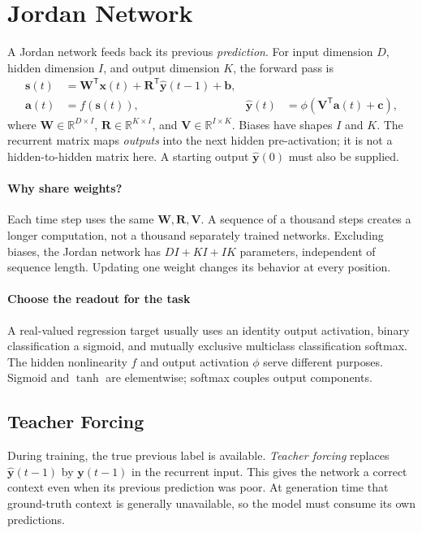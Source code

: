\documentclass[11pt, oneside]{book}
\newcommand{\R}{\mathbb{R}}
\newcommand{\T}{^{\mathsf{T}}}           %
\let\originalsection\section
\renewcommand{\section}{\Needspace{7\baselineskip}\originalsection}
\let\originalsubsection\subsection
\renewcommand{\subsection}{\Needspace{6\baselineskip}\originalsubsection}
\begin{document}
\section{Jordan Network}\label{sec:source-1-1}
A Jordan network feeds back its previous \emph{prediction}. For input dimension $D$, hidden dimension $I$, and output dimension $K$, the forward pass is
\begin{align}
 \mathbf{s}(t)&=\mathbf{W}\T\mathbf{x}(t)+\mathbf{R}\T\widehat{\mathbf{y}}(t-1)+\mathbf{b},\\
 \mathbf{a}(t)&=f(\mathbf{s}(t)),&
 \widehat{\mathbf{y}}(t)&=\phi(\mathbf{V}\T\mathbf{a}(t)+\mathbf{c}),
\end{align}
where $\mathbf{W}\in\R^{D\times I}$, $\mathbf{R}\in\R^{K\times I}$, and $\mathbf{V}\in\R^{I\times K}$. Biases have shapes $I$ and $K$. The recurrent matrix maps \emph{outputs} into the next hidden pre-activation; it is not a hidden-to-hidden matrix here. A starting output $\widehat{\mathbf{y}}(0)$ must also be supplied.

\paragraph{Why share weights?} Each time step uses the same $\mathbf{W},\mathbf{R},\mathbf{V}$. A sequence of a thousand steps creates a longer computation, not a thousand separately trained networks. Excluding biases, the Jordan network has $DI+KI+IK$ parameters, independent of sequence length. Updating one weight changes its behavior at every position.

\paragraph{Choose the readout for the task} A real-valued regression target usually uses an identity output activation, binary classification a sigmoid, and mutually exclusive multiclass classification softmax. The hidden nonlinearity $f$ and output activation $\phi$ serve different purposes. Sigmoid and $\tanh$ are elementwise; softmax couples output components.

\subsection{Teacher Forcing}
During training, the true previous label is available. \emph{Teacher forcing} replaces $\widehat{\mathbf{y}}(t-1)$ by $\mathbf{y}(t-1)$ in the recurrent input. This gives the network a correct context even when its previous prediction was poor. At generation time that ground-truth context is generally unavailable, so the model must consume its own predictions.
\end{document}
